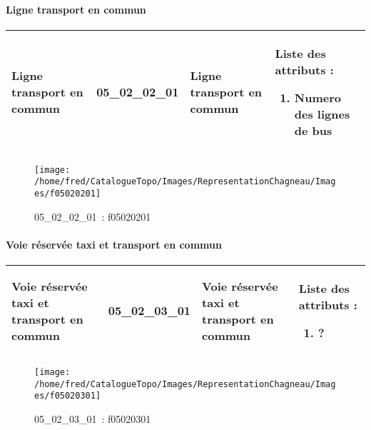 \documentclass[12pt,titlepage]{book}
\begin{document}
\paragraph{Ligne transport en commun}
\noindent
\vspace{\baselineskip}

\renewcommand{\arraystretch}{1.2}
\begin{supertabular}{|p{10cm}|c|p{13cm}|p{12cm}|}
 Ligne transport en commun & 05\_02\_02\_01 & Ligne transport en commun & Liste des attributs :
\begin{enumerate}
  \item Numero des lignes de bus\end{enumerate}
\\
\hline
\end{supertabular}
\begin{figure}[h!]
  \hfill         %
  \begin{minipage}[t]{3cm}
    \begin{center}
      \texttt{[image: /home/fred/CatalogueTopo/Images/RepresentationChagneau/Images/f05020201]}
      \caption[~05\_02\_02\_01]{\small{05\_02\_02\_01~:} \tiny{f05020201}}\label{f05020201}
    \end{center}
  \end{minipage}
\end{figure}


\paragraph{Voie réservée taxi et transport en commun}
\noindent
\vspace{\baselineskip}

\renewcommand{\arraystretch}{1.2}
\begin{supertabular}{|p{10cm}|c|p{13cm}|p{12cm}|}
 Voie réservée taxi et transport en commun & 05\_02\_03\_01 & Voie réservée taxi et transport en commun & Liste des attributs :
\begin{enumerate}
  \item ?\end{enumerate}
\\
\hline
\end{supertabular}
\begin{figure}[h!]
  \hfill         %
  \begin{minipage}[t]{3cm}
    \begin{center}
      \texttt{[image: /home/fred/CatalogueTopo/Images/RepresentationChagneau/Images/f05020301]}
      \caption[~05\_02\_03\_01]{\small{05\_02\_03\_01~:} \tiny{f05020301}}\label{f05020301}
    \end{center}
  \end{minipage}
\end{figure}
\end{document}
